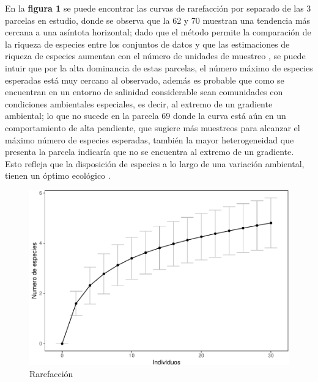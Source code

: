 \documentclass[conference,final,12pt,]{IEEEtran}
\makeatletter
\def\maxwidth{\ifdim\Gin@nat@width>\linewidth\linewidth
\else\Gin@nat@width\fi}
\let\Oldincludegraphics\includegraphics
\renewcommand{\includegraphics}[1]{\Oldincludegraphics[width=\maxwidth]{#1}}
\makeatother
\begin{document}
En la \textbf{figura 1} se puede encontrar las
curvas de rarefacción por separado de las 3 parcelas en estudio, donde
se observa que la 62 y 70 muestran una tendencia más cercana a una
asíntota horizontal; dado que el método permite la comparación de la
riqueza de especies entre los conjuntos de datos \citep{AM} y que las
estimaciones de riqueza de especies aumentan con el número de unidades
de muestreo \citep{AN}, se puede intuir que por la alta dominancia de
estas parcelas, el número máximo de especies esperadas está muy cercano
al observado, además es probable que como se encuentran en un entorno de
salinidad considerable sean comunidades con condiciones ambientales
especiales, es decir, al extremo de un gradiente ambiental; lo que no
sucede en la parcela 69 donde la curva está aún en un comportamiento de
alta pendiente, que sugiere más muestreos para alcanzar el máximo número
de especies esperadas, también la mayor heterogeneidad que presenta la
parcela indicaría que no se encuentra al extremo de un gradiente. Esto
refleja que la disposición de especies a lo largo de una variación
ambiental, tienen un óptimo ecológico \citep{AO}.

\begin{figure}[htb]
\centering
\includegraphics{mangrove_files/figure-latex/unnamed-chunk-6-1.pdf}
\caption{Rarefacción}
\end{figure}
\end{document}
